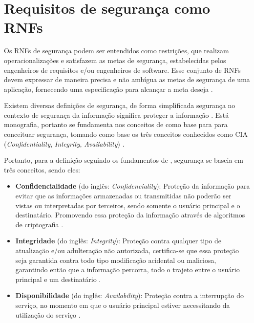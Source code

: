 \section{Requisitos de segurança como RNFs}
\label{sec:seguranca}

Os RNFs de segurança podem ser entendidos como restrições, que realizam operacionalizações e satisfazem as metas de segurança, estabelecidas pelos engenheiros de requisitos e/ou engenheiros de software. Esse conjunto de  RNFs devem expressar de maneira precisa e não ambígua as metas de segurança de uma aplicação, fornecendo uma especificação para alcançar a meta deseja \cite{haley2006framework}.  

Existem diversas definições de segurança, de forma simplificada segurança no contexto de segurança da informação significa proteger a informação \cite{chung2012non}. Está monografia, portanto se fundamenta nos conceitos de \cite{chung2012non} \cite{sullivan2011web} como base para para conceituar segurança, tomando como base os três conceitos conhecidos como CIA (\textit{Confidentiality}, \textit{Integrity}, \textit{Availability}) . 

Portanto, para a definição seguindo os fundamentos de \cite{chung2012non}, segurança se baseia em três conceitos, sendo eles: 

\begin{itemize}
	\item \textbf{Confidencialidade} (do inglês: \textit{Confidenciality}): Proteção da informação para evitar que as informações armazenadas ou transmitidas não poderão ser vistas ou interpretadas por terceiros, sendo somente o usuário principal e o destinatário. Promovendo essa proteção da informação através de algoritmos de criptografia \cite{chung2012non} \cite{silva2007arquitetura}. 
	
	\item \textbf{Integridade} (do inglês: \textit{Integrity}): Proteção contra qualquer tipo de atualização e/ou adulteração não autorizada, certifica-se que essa proteção seja garantida contra todo tipo modificação acidental ou maliciosa, garantindo então que a informação percorra, todo o trajeto entre o usuário principal e um destinatário \cite{chung2012non} \cite{silva2007arquitetura}. 
	
	\item \textbf{Disponibilidade} (do inglês: \textit{Availability}): Proteção contra a interrupção do serviço, no momento em que o usuário principal estiver necessitando da utilização do serviço \cite{chung2012non} \cite{silva2007arquitetura}.
	  
\end{itemize}


